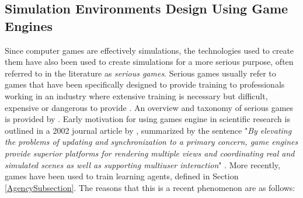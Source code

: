 \subsection{Simulation Environments Design Using Game Engines}\label{GameEngineReview}
Since computer games are effectively simulations, the technologies used to create them have also been used to create simulations for a more serious purpose, often referred to in the literature as \textit{serious games}. Serious games usually refer to games that have been specifically designed to provide training to professionals working in an industry where extensive training is necessary but difficult, expensive or dangerous to provide \cite{Sobke2016SeriousEngines}. An overview and taxonomy of serious games is provided by \citeauthor{Laamarti2014AnGames} \cite{Laamarti2014AnGames}. Early motivation for using games engine in scientific research is outlined in a 2002 journal article by \citeauthor{Lewis2002GameEnginesInScientificResearch}, summarized by the sentence "\textit{By elevating the problems of updating and synchronization to a primary concern, game engines provide superior platforms for rendering multiple views and coordinating real and simulated scenes as well as supporting multiuser interaction}" \cite{Lewis2002GameEnginesInScientificResearch}.  More recently, games have been used to train learning agents, defined in Section \ref{AgencySubsection}. The reasons that this is a recent phenomenon are as follows:
